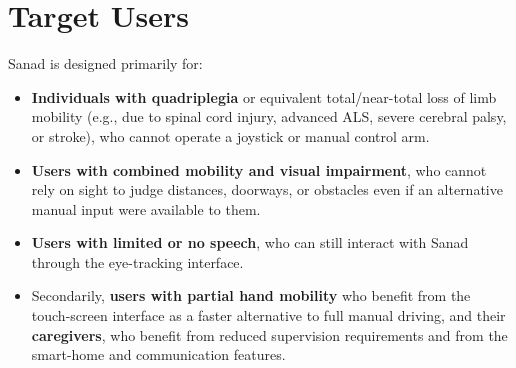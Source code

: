 \section{Target Users}

Sanad is designed primarily for:

\begin{itemize}
    \item \textbf{Individuals with quadriplegia} or equivalent total/near-total loss of limb mobility (e.g., due to spinal cord injury, advanced ALS, severe cerebral palsy, or stroke), who cannot operate a joystick or manual control arm.
    \item \textbf{Users with combined mobility and visual impairment}, who cannot rely on sight to judge distances, doorways, or obstacles even if an alternative manual input were available to them.
    \item \textbf{Users with limited or no speech}, who can still interact with Sanad through the eye-tracking interface.
    \item Secondarily, \textbf{users with partial hand mobility} who benefit from the touch-screen interface as a faster alternative to full manual driving, and their \textbf{caregivers}, who benefit from reduced supervision requirements and from the smart-home and communication features.
\end{itemize}


